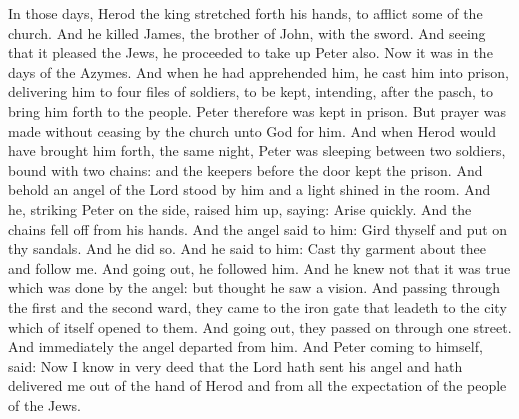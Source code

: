 




In those days, Herod the king stretched forth his hands, to
afflict some of the church.
And he killed James, the brother of John, with the sword.
And seeing that it pleased the Jews, he proceeded to take up Peter
also. Now it was in the days of the Azymes.
And when he had apprehended him, he cast him into prison,
delivering him to four files of soldiers, to be kept, intending, after
the pasch, to bring him forth to the people.
Peter therefore was kept in prison. But prayer was made without
ceasing by the church unto God for him.
And when Herod would have brought him forth, the same night, Peter
was sleeping between two soldiers, bound with two chains: and the
keepers before the door kept the prison.
And behold an angel of the Lord stood by him and a light shined in
the room. And he, striking Peter on the side, raised him up, saying:
Arise quickly. And the chains fell off from his hands.
And the angel said to him: Gird thyself and put on thy sandals.
And he did so. And he said to him: Cast thy garment about thee and
follow me.
And going out, he followed him. And he knew not that it was true
which was done by the angel: but thought he saw a vision.
And passing through the first and the second ward, they came to
the iron gate that leadeth to the city which of itself opened to them.
And going out, they passed on through one street. And immediately the
angel departed from him.
And Peter coming to himself, said: Now I know in very deed that
the Lord hath sent his angel and hath delivered me out of the hand of
Herod and from all the expectation of the people of the Jews.

\medskip


